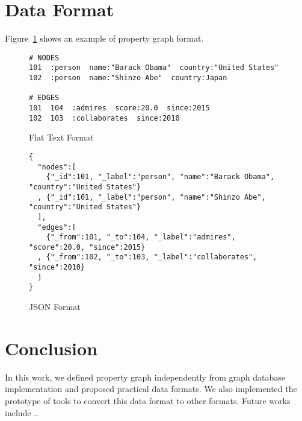 \documentclass[runningheads]{llncs}
\begin{document}
\section{Data Format}

Figure~\ref{fig:format-pg} shows an example of property graph format.

\begin{figure}[!t]
\vspace{2mm}
\begin{scriptsize}
\begin{verbatim}
# NODES
101  :person  name:"Barack Obama"  country:"United States"
102  :person  name:"Shinzo Abe"  country:Japan

# EDGES
101  104  :admires  score:20.0  since:2015
102  103  :collaborates  since:2010
\end{verbatim}
\end{scriptsize}
\caption{Flat Text Format}
\label{fig:format-pg}
\end{figure}

\begin{figure}[!t]
\vspace{2mm}
\begin{scriptsize}
\begin{verbatim}
{
  "nodes":[
    {"_id":101, "_label":"person", "name":"Barack Obama", "country":"United States"}
  , {"_id":101, "_label":"person", "name":"Shinzo Abe", "country":"United States"}
  ],
  "edges":[
    {"_from":101, "_to":104, "_label":"admires", "score":20.0, "since":2015}
  , {"_from":102, "_to":103, "_label":"collaborates", "since":2010}
  ]
}
\end{verbatim}
\end{scriptsize}
\caption{JSON Format}
\label{fig:format-jsonpg}
\end{figure}

\section{Conclusion}
In this work, we defined property graph independently from graph database implementation and proposed practical data formats. We also implemented the prototype of tools to convert this data format to other formats. Future works include ..
\end{document}
